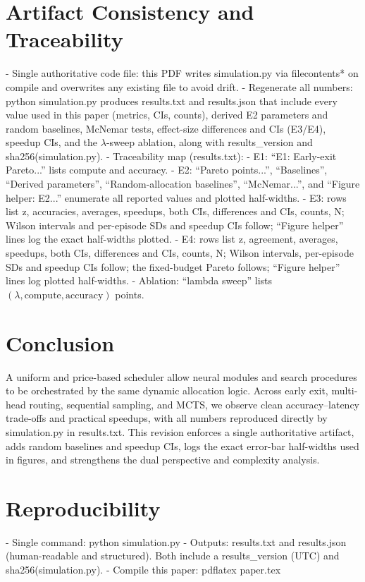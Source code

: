 \section{Artifact Consistency and Traceability}
- Single authoritative code file: this PDF writes simulation.py via filecontents* on compile and overwrites any existing file to avoid drift.
- Regenerate all numbers: python simulation.py produces results.txt and results.json that include every value used in this paper (metrics, CIs, counts), derived E2 parameters and random baselines, McNemar tests, effect-size differences and CIs (E3/E4), speedup CIs, and the $\lambda$-sweep ablation, along with results\_version and sha256(simulation.py).
- Traceability map (results.txt):
  - E1: ``E1: Early-exit Pareto...'' lists compute and accuracy.
  - E2: ``Pareto points...'', ``Baselines'', ``Derived parameters'', ``Random-allocation baselines'', ``McNemar...'', and ``Figure helper: E2...'' enumerate all reported values and plotted half-widths.
  - E3: rows list z, accuracies, averages, speedups, both CIs, differences and CIs, counts, N; Wilson intervals and per-episode SDs and speedup CIs follow; ``Figure helper'' lines log the exact half-widths plotted.
  - E4: rows list z, agreement, averages, speedups, both CIs, differences and CIs, counts, N; Wilson intervals, per-episode SDs and speedup CIs follow; the fixed-budget Pareto follows; ``Figure helper'' lines log plotted half-widths.
  - Ablation: ``lambda sweep'' lists $(\lambda,\mathrm{compute},\mathrm{accuracy})$ points.

\section{Conclusion}
A uniform \TickAPI{} and price-based scheduler allow neural modules and search procedures to be orchestrated by the same dynamic allocation logic. Across early exit, multi-head routing, sequential sampling, and MCTS, we observe clean accuracy--latency trade-offs and practical speedups, with all numbers reproduced directly by simulation.py in results.txt. This revision enforces a single authoritative artifact, adds random baselines and speedup CIs, logs the exact error-bar half-widths used in figures, and strengthens the dual perspective and complexity analysis.

\section*{Reproducibility}
- Single command: python simulation.py
- Outputs: results.txt and results.json (human-readable and structured). Both include a results\_version (UTC) and sha256(simulation.py).
- Compile this paper: pdflatex paper.tex

